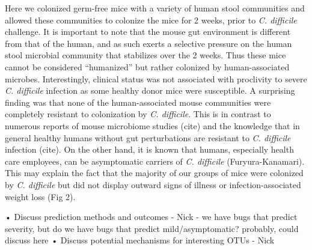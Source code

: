 \documentclass[11pt,]{article}
\begin{document}
Here we colonized germ-free mice with a variety of human stool
communities and allowed these communities to colonize the mice for 2
weeks, prior to \emph{C. difficile} challenge. It is important to note
that the mouse gut environment is different from that of the human, and
as such exerts a selective pressure on the human stool microbial
community that stabilizes over the 2 weeks. Thus these mice cannot be
considered ``humanized'' but rather colonized by human-associated
microbes. Interestingly, clinical status was not associated with
proclivity to severe \emph{C. difficile} infection as some healthy donor
mice were susceptible. A surprising finding was that none of the
human-associated mouse communities were completely resistant to
colonization by \emph{C. difficile}. This is in contrast to numerous
reports of mouse microbiome studies (cite) and the knowledge that in
general healthy humans without gut perturbations are resistant to
\emph{C. difficile} infection (cite). On the other hand, it is known
that humans, especially health care employees, can be asymptomatic
carriers of \emph{C. difficile} (Furyura-Kanamari). This may explain the
fact that the majority of our groups of mice were colonized by \emph{C.
difficile} but did not display outward signs of illness or
infection-associated weight loss (Fig 2).

• Discuss prediction methods and outcomes - Nick - we have bugs that
predict severity, but do we have bugs that predict mild/asymptomatic?
probably, could discuss here • Discuss potential mechanisms for
interesting OTUs - Nick
\end{document}

